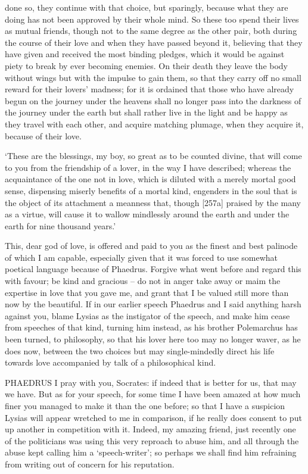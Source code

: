 done so, they continue with that choice, but sparingly, because what
they are doing has not been approved by their whole mind. So these too
spend their lives as mutual friends, though  not to the same
degree as the other pair, both during the course of their love and when
they have passed beyond it, believing that they have given and received
the most binding pledges, which it would be against piety to break by
ever becoming  enemies. On their death they leave the body
without wings but with the impulse to gain them, so that they carry off
no small reward for their lovers' madness; for it is ordained that those
who have already begun on the journey under the heavens shall no longer
pass into the darkness of the journey under the earth but shall rather
live in the light and be happy as they travel  with each other,
and acquire matching plumage, when they acquire it, because of their
love.

‘These are the blessings, my boy, so great as to be counted divine, that
will come to you from the friendship of a lover, in the way I have
described; whereas the acquaintance of the one  not in love,
which is diluted with a merely mortal good sense, dispensing miserly
benefits of a mortal kind, engenders in the soul that is the object of
its attachment a meanness that, though {[}257a{]} praised by the many as
a virtue, will cause it to wallow mindlessly around the earth and under
the earth for nine thousand years.'

This, dear god of love, is offered and paid to you as the finest
 and best palinode of which I am capable, especially given that
it was forced to use somewhat poetical language because of
Phaedrus. Forgive what
went before and regard this with favour; be kind and gracious -- do not
in anger take away or maim the expertise in love that you gave
me, and grant that
 I be valued still more than now by the beautiful. If in our
earlier speech Phaedrus and I said anything harsh against you, blame
Lysias as the instigator of the speech, and make him cease from speeches
of that kind, turning him instead, as his brother
Polemarchus has been
turned, to philosophy, so that his lover here too may no longer waver,
as he does now, between the  two choices but may single-mindedly
direct his life towards love accompanied by
talk of a philosophical
kind.

PHAEDRUS I pray with you, Socrates: if indeed that is better 
for us, that may we have. But as for your speech, for some time I have
been amazed at how much finer you managed to make it than the one
before; so that I have a suspicion Lysias will appear wretched to me in
comparison, if he really does consent to put up another in competition
with it. Indeed, my amazing friend, just recently one of the politicians
was using this very  reproach to abuse him, and all through the
abuse kept calling him a ‘speech-writer'; so perhaps we shall find him
refraining from writing out of concern for his reputation.

